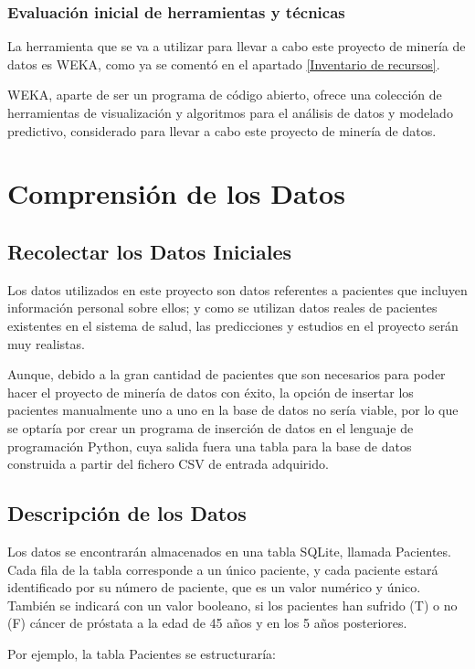 \documentclass{article}
\begin{document}
\subsubsection{Evaluación inicial de herramientas y técnicas}\label{Evaluación inicial de herramientas y técnicas}
La herramienta que se va a utilizar para llevar a cabo este proyecto de minería de datos es WEKA, como ya se comentó en el apartado \ref{Inventario de recursos}. 

WEKA, aparte de ser un programa de código abierto, ofrece una colección de herramientas de visualización y algoritmos para el análisis de datos y modelado predictivo, considerado para llevar a cabo este proyecto de minería de datos.  

\section{Comprensión de los Datos}

\subsection{Recolectar los Datos Iniciales}
Los datos utilizados en este proyecto son datos referentes a pacientes que incluyen información personal sobre ellos; y como se utilizan datos reales de pacientes existentes en el sistema de salud, las predicciones y estudios en el proyecto serán muy realistas.

Aunque, debido a la gran cantidad de pacientes que son necesarios para poder hacer el proyecto de minería de datos con éxito, la opción de insertar los pacientes manualmente uno a uno en la base de datos no sería viable, por lo que se optaría por crear un programa de inserción de datos en el lenguaje de programación Python, cuya salida fuera una tabla para la base de datos construida a partir del fichero CSV de entrada adquirido.

\subsection{Descripción de los Datos}
Los datos se encontrarán almacenados en una tabla SQLite, llamada Pacientes. Cada fila de la tabla corresponde a un único paciente, y cada paciente estará identificado por su número de paciente, que es un valor numérico y único. También se indicará con un valor booleano, si los pacientes han sufrido (T) o no (F) cáncer de próstata a la edad de 45 años y en los 5 años posteriores.

Por ejemplo, la tabla Pacientes se estructuraría:
\end{document}
